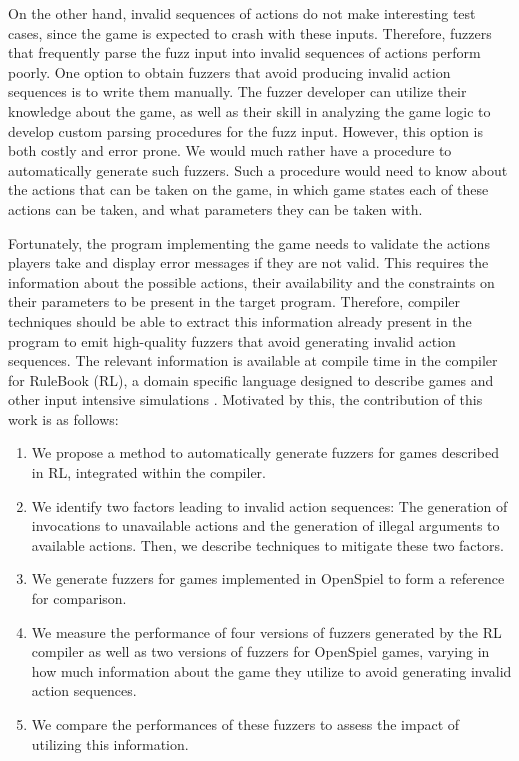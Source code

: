 On the other hand, invalid sequences of actions do not make interesting test cases, since the game is expected to crash with these inputs.
Therefore, fuzzers that frequently parse the fuzz input into invalid sequences of actions perform poorly.
One option to obtain fuzzers that avoid producing invalid action sequences is to write them manually.
The fuzzer developer can utilize their knowledge about the game, as well as their skill in analyzing the game logic to develop custom parsing procedures for the fuzz input.
However, this option is both costly and error prone.
We would much rather have a procedure to automatically generate such fuzzers.
Such a procedure would need to know about the actions that can be taken on the game, in which game states each of these actions can be taken, and what parameters they can be taken with.

Fortunately, the program implementing the game needs to validate the actions players take and display error messages if they are not valid.
This requires the information about the possible actions, their availability and the constraints on their parameters to be present in the target program.
Therefore, compiler techniques should be able to extract this information already present in the program to emit high-quality fuzzers that avoid generating invalid action sequences.
The relevant information is available at compile time in the compiler for RuleBook (RL), a domain specific language designed to describe games and other input intensive simulations \cite{RLC}.
Motivated by this, the contribution of this work is as follows:
\begin{enumerate}
    \item We propose a method to automatically generate fuzzers for games described in RL, integrated within the compiler.
    \item We identify two factors leading to invalid action sequences: The generation of invocations to unavailable actions and the generation of illegal arguments to available actions. Then, we describe techniques to mitigate these two factors.
    \item We generate fuzzers for games implemented in OpenSpiel to form a reference for comparison.
    \item We measure the performance of four versions of fuzzers generated by the RL compiler as well as two versions of fuzzers for OpenSpiel games, varying in how much information about the game they utilize to avoid generating invalid action sequences.
    \item We compare the performances of these fuzzers to assess the impact of utilizing this information.
\end{enumerate}

